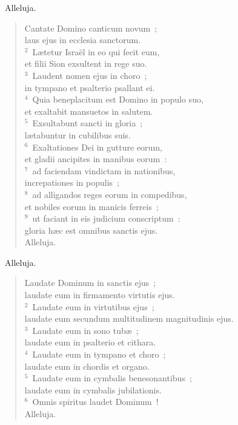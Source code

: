 ~\lettrine[lines=10,image=true,loversize=0.05,lraise=-0.03]{A}{}lleluja. \begin{flushleft}\begin{verse}\vspace{6pt}Cantate Domino canticum novum~;\\ laus ejus in ecclesia sanctorum.\\
${}^{2}$~L\ae tetur Isra\"el in eo qui fecit eum,\\ et filii Sion exsultent in rege suo.\\
${}^{3}$~Laudent nomen ejus in choro~;\\ in tympano et psalterio psallant ei.\\
${}^{4}$~Quia beneplacitum est Domino in populo suo,\\ et exaltabit mansuetos in salutem.\\
${}^{5}$~Exsultabunt sancti in gloria~;\\ l\ae tabuntur in cubilibus suis.\\
${}^{6}$~Exaltationes Dei in gutture eorum,\\ et gladii ancipites in manibus eorum~:\\
${}^{7}$~ad faciendam vindictam in nationibus,\\ increpationes in populis~;\\
${}^{8}$~ad alligandos reges eorum in compedibus,\\ et nobiles eorum in manicis ferreis~;\\
${}^{9}$~ut faciant in eis judicium conscriptum~:\\ gloria h\ae c est omnibus sanctis ejus.\\ Alleluja.\end{verse}\end{flushleft}


~\lettrine[lines=10,image=true,loversize=0.05,lraise=-0.03]{A}{}lleluja. \begin{flushleft}\begin{verse}\vspace{6pt}Laudate Dominum in sanctis ejus~;\\ laudate eum in firmamento virtutis ejus.\\
${}^{2}$~Laudate eum in virtutibus ejus~;\\ laudate eum secundum multitudinem magnitudinis ejus.\\
${}^{3}$~Laudate eum in sono tub\ae~;\\ laudate eum in psalterio et cithara.\\
${}^{4}$~Laudate eum in tympano et choro~;\\ laudate eum in chordis et organo.\\
${}^{5}$~Laudate eum in cymbalis benesonantibus~;\\ laudate eum in cymbalis jubilationis.\\
${}^{6}$~Omnis spiritus laudet Dominum~!\\ Alleluja.\end{verse}\end{flushleft}



